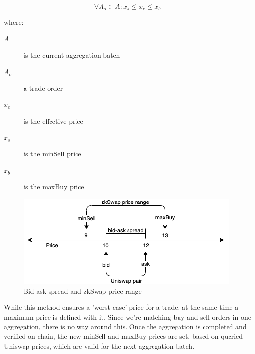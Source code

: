\documentclass[../../thesis.tex]{subfiles}
\begin{document}
$$\forall A_o\in A: x_s \leq x_e \leq x_b$$


where:
\begin{description}
\item[$A$] is the current aggregation batch
\item[$A_o$] a trade order
\item[$x_e$] is the effective price 
\item[$x_s$] is the minSell price
\item[$x_b$] is the maxBuy price 
\end{description}

\begin{figure}[h]
    \centerline{\includegraphics[totalheight=3cm]{diagrams/priceing.png}}
    \caption{Bid-ask spread and zkSwap price range}
    \label{fig:price}
\end{figure}

While this method ensures a 'worst-case' price for a trade, at the same time a maximum price is defined with it. Since we're matching buy and sell orders in one aggregation, there is no way around this. Once the aggregation is completed and verified on-chain, the new minSell and maxBuy prices are set, based on queried Uniswap prices, which are valid for the next aggregation batch.
\end{document}
